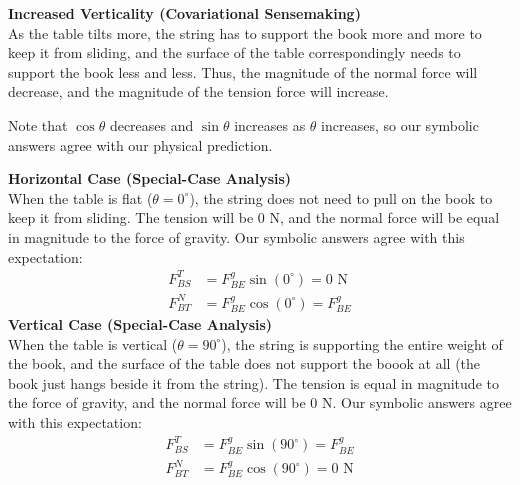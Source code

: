 \documentclass[]{article}
\begin{document}
\begin{TeacherMargin}
\noindent\textbf{Increased Verticality (Covariational Sensemaking)} \\
As the table tilts more, the string has to support the book more and more to keep it from sliding, and the surface of the table correspondingly needs to support the book less and less. Thus, the magnitude of the normal force will decrease, and the magnitude of the tension force will increase.

Note that $\cos\theta$ decreases and $\sin\theta$ increases as $\theta$ increases, so our symbolic answers agree with our physical prediction.

\noindent\textbf{Horizontal Case (Special-Case Analysis)} \\
When the table is flat ($\theta=0^{\circ}$), the string does not need to pull on the book to keep it from sliding. The tension will be 0 N, and the normal force will be equal in magnitude to the force of gravity. Our symbolic answers agree with this expectation:
\begin{align*}
	F^{T}_{BS} & = F^{g}_{BE}\sin(0^{\circ}) = 0\text{ N} \\
	F^{N}_{BT} & = F^{g}_{BE}\cos(0^{\circ}) = F^{g}_{BE}
\end{align*}
\textbf{Vertical Case (Special-Case Analysis)} \\
When the table is vertical ($\theta=90^{\circ}$), the string is supporting the entire weight of the book, and the surface of the table does not support the boook at all (the book just hangs beside it from the string). The tension is equal in magnitude to the force of gravity, and the normal force will be 0 N. Our symbolic answers agree with this expectation:
\begin{align*}
	F^{T}_{BS} & = F^{g}_{BE}\sin(90^{\circ}) = F^{g}_{BE} \\
	F^{N}_{BT} & = F^{g}_{BE}\cos(90^{\circ}) = 0\text{ N}
\end{align*}
\end{TeacherMargin}
\end{document}
